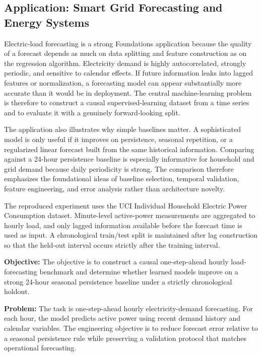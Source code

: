 \subsection{Application: Smart Grid Forecasting and Energy Systems}

Electric-load forecasting is a strong Foundations application because the quality of a forecast depends as much on data splitting and feature construction as on the regression algorithm. Electricity demand is highly autocorrelated, strongly periodic, and sensitive to calendar effects. If future information leaks into lagged features or normalization, a forecasting model can appear substantially more accurate than it would be in deployment. The central machine-learning problem is therefore to construct a causal supervised-learning dataset from a time series and to evaluate it with a genuinely forward-looking split.

The application also illustrates why simple baselines matter. A sophisticated model is only useful if it improves on persistence, seasonal repetition, or a regularized linear forecast built from the same historical information. Comparing against a 24-hour persistence baseline is especially informative for household and grid demand because daily periodicity is strong. The comparison therefore emphasizes the foundational ideas of baseline selection, temporal validation, feature engineering, and error analysis rather than architecture novelty.

The reproduced experiment uses the UCI Individual Household Electric Power Consumption dataset. Minute-level active-power measurements are aggregated to hourly load, and only lagged information available before the forecast time is used as input. A chronological train/test split is maintained after lag construction so that the held-out interval occurs strictly after the training interval.

\textbf{Objective:} The objective is to construct a causal one-step-ahead hourly load-forecasting benchmark and determine whether learned models improve on a strong 24-hour seasonal persistence baseline under a strictly chronological holdout.

\textbf{Problem:} The task is one-step-ahead hourly electricity-demand forecasting. For each hour, the model predicts active power using recent demand history and calendar variables. The engineering objective is to reduce forecast error relative to a seasonal persistence rule while preserving a validation protocol that matches operational forecasting.

